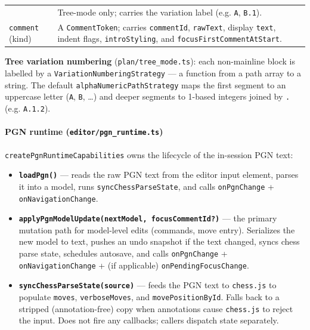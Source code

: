 \documentclass[]{article}
\providecommand{\tightlist}{%
  \setlength{\itemsep}{0pt}\setlength{\parskip}{0pt}}
\let\oldparagraph\paragraph
\renewcommand{\paragraph}[1]{\oldparagraph{#1}\mbox{}}
\begin{document}
\begin{longtable}[]{@{}ll@{}}
\begin{minipage}[t]{0.05\columnwidth}
\end{minipage} & \begin{minipage}[t]{0.05\columnwidth}\raggedright\strut
Tree-mode only; carries the variation label (e.g. \texttt{A},
\texttt{B.1}).\strut
\end{minipage}\tabularnewline
\begin{minipage}[t]{0.05\columnwidth}\raggedright\strut
\texttt{comment} (kind)\strut
\end{minipage} & \begin{minipage}[t]{0.05\columnwidth}\raggedright\strut
A \texttt{CommentToken}; carries \texttt{commentId}, \texttt{rawText},
display \texttt{text}, indent flags, \texttt{introStyling}, and
\texttt{focusFirstCommentAtStart}.\strut
\end{minipage}\tabularnewline
\bottomrule
\end{longtable}

\textbf{Tree variation numbering} (\texttt{plan/tree\_mode.ts}): each
non-mainline block is labelled by a \texttt{VariationNumberingStrategy}
--- a function from a path array to a string. The default
\texttt{alphaNumericPathStrategy} maps the first segment to an uppercase
letter (\texttt{A}, \texttt{B}, \ldots{}) and deeper segments to 1-based
integers joined by \texttt{.} (e.g. \texttt{A.1.2}).

\paragraph{\texorpdfstring{PGN runtime
(\texttt{editor/pgn\_runtime.ts})}{PGN runtime (editor/pgn\_runtime.ts)}}\label{pgn-runtime-editorpgn_runtime.ts}

\texttt{createPgnRuntimeCapabilities} owns the lifecycle of the
in-session PGN text:

\begin{itemize}
\tightlist
\item
  \textbf{\texttt{loadPgn()}} --- reads the raw PGN text from the editor
  input element, parses it into a model, runs
  \texttt{syncChessParseState}, and calls \texttt{onPgnChange} +
  \texttt{onNavigationChange}.
\item
  \textbf{\texttt{applyPgnModelUpdate(nextModel,\ focusCommentId?)}} ---
  the primary mutation path for model-level edits (commands, move
  entry). Serializes the new model to text, pushes an undo snapshot if
  the text changed, syncs chess parse state, schedules autosave, and
  calls \texttt{onPgnChange} + \texttt{onNavigationChange} + (if
  applicable) \texttt{onPendingFocusChange}.
\item
  \textbf{\texttt{syncChessParseState(source)}} --- feeds the PGN text
  to \texttt{chess.js} to populate \texttt{moves},
  \texttt{verboseMoves}, and \texttt{movePositionById}. Falls back to a
  stripped (annotation-free) copy when annotations cause
  \texttt{chess.js} to reject the input. Does not fire any callbacks;
  callers dispatch state separately.
\end{itemize}
\end{document}
